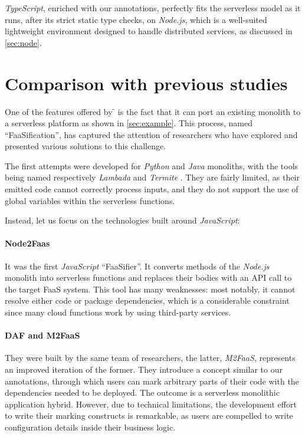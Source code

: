 \textit{TypeScript}, enriched with our annotations, perfectly fits
the serverless model as it runs, after its strict static type checks,
on \textit{Node.js}, which is a well-suited lightweight environment
designed to handle distributed services, as discussed in \cref{sec:node}.

\section{Comparison with previous studies}

One of the features offered by \f{} is the fact that it can port
an existing monolith to a serverless platform as shown in \cref{sec:example}.
This process, named ``FaaSification'', has captured the attention of researchers
who have explored and presented various solutions to this challenge.

The first attempts were developed for \textit{Python} and \textit{Java} monoliths,
with the tools being named respectively \textit{Lambada} \cite{lambada} and \textit{Termite} \cite{termite}.
They are fairly limited, as their emitted code cannot correctly process inputs,
and they do not support the use of global variables within the serverless functions.

Instead, let us focus on the technologies built around \textit{JavaScript}:

\paragraph{\textbf{Node2Faas} \cite{node2faas}}
It was the first \textit{JavaScript} ``FaaSifier''.
It converts methods of the \textit{Node.js} monolith into serverless
functions and replaces their bodies with an API call to the target FaaS system.
This tool has many weaknesses: most notably, it cannot resolve either code
or package dependencies, which is a considerable constraint since many
cloud functions work by using third-party services.

\paragraph{\textbf{DAF} and \textbf{M2FaaS} \cite{daf, m2faas}}
They were built by the same team of researchers, the latter, \textit{M2FaaS},
represents an improved iteration of the former.
They introduce a concept similar to our annotations, through which users
can mark arbitrary parts of their code with the dependencies needed to be deployed.
The outcome is a serverless monolithic application hybrid. 
However, due to technical limitations, the development effort to write their marking constructs
is remarkable, as users are compelled to write configuration details inside their business logic.

